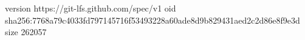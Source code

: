 version https://git-lfs.github.com/spec/v1
oid sha256:7768a79c4033fd797145716f53493228a60ade8d9b829431aed2c2d86e8f9e3d
size 262057
